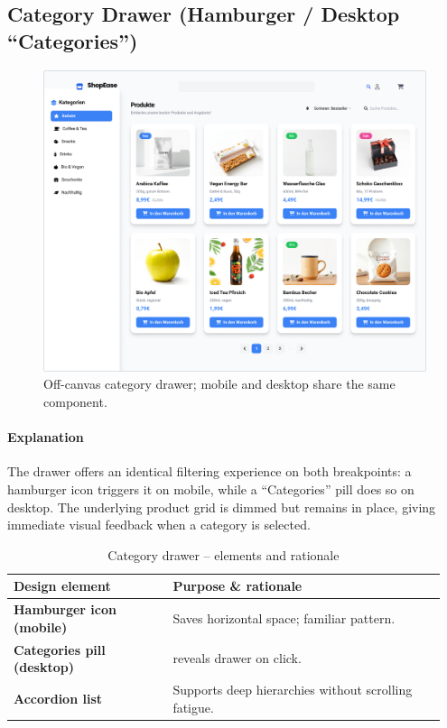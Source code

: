 \documentclass[12pt]{article}
\begin{document}
	\subsection{Category Drawer (Hamburger / Desktop “Categories”)}\label{subsec:category-drawer-(hamburger-/-desktop-categories)}

	\begin{figure}[H]
		\centering
		\includegraphics[width=\linewidth]{pictures/main/categories_Figma}%
		\caption{Off-canvas category drawer; mobile and desktop share the same component.}
		\label{fig:ui-category-drawer}
	\end{figure}

	\paragraph{Explanation}
	The drawer offers an identical filtering experience on both breakpoints:
	a hamburger icon triggers it on mobile, while a “Categories” pill does so on
	desktop.
	The underlying product grid is dimmed but remains in place, giving
	immediate visual feedback when a category is selected.

	\begin{table}[H]
		\centering
		\caption{Category drawer – elements and rationale}
		\label{tab:category-elements}
		\begin{tabular}{p{0.35\linewidth} p{0.60\linewidth}}
			\toprule
			\textbf{Design element} 				& Purpose \& rationale \\ \midrule
			\textbf{Hamburger icon (mobile)} 		& Saves horizontal space; familiar pattern. \\
			\textbf{Categories pill (desktop)} 		& reveals drawer on click. \\
			\textbf{Accordion list}          		& Supports deep hierarchies without scrolling fatigue. \\
			\bottomrule
		\end{tabular}
	\end{table}
\end{document}

